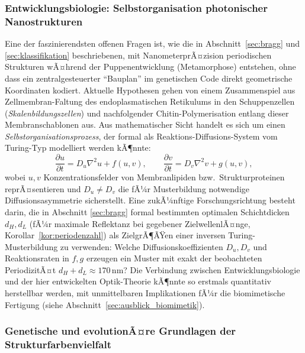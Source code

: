 ﻿\documentclass[a4paper,12pt]{article}
\theoremstyle{definition}
\begin{document}
	\subsubsection{Entwicklungsbiologie: Selbstorganisation photonischer Nanostrukturen}

	Eine der faszinierendsten offenen Fragen ist, wie die in
	Abschnitt~\ref{sec:bragg} und \ref{sec:klassifikation} beschriebenen,
	mit NanometerprÃ¤zision periodischen Strukturen wÃ¤hrend der
	Puppenentwicklung (Metamorphose) entstehen, ohne dass ein
	zentralgesteuerter ``Bauplan'' im genetischen Code direkt
	geometrische Koordinaten kodiert. Aktuelle Hypothesen gehen von
	einem Zusammenspiel aus Zellmembran-Faltung des endoplasmatischen
	Retikulums in den Schuppenzellen (\textit{Skalenbildungszellen})
	und nachfolgender Chitin-Polymerisation entlang dieser Membranschablonen
	aus. Aus mathematischer Sicht handelt es sich um einen
	\emph{Selbstorganisationsprozess}, der formal als
	Reaktions-Diffusions-System vom Turing-Typ modelliert werden kÃ¶nnte:
	\[
	\frac{\partial u}{\partial t} = D_u \nabla^2 u + f(u,v), \qquad
	\frac{\partial v}{\partial t} = D_v \nabla^2 v + g(u,v),
	\]
	wobei $u,v$ Konzentrationsfelder von Membranlipiden bzw.\
	Strukturproteinen reprÃ¤sentieren und $D_u \ne D_v$ die fÃ¼r
	Musterbildung notwendige Diffusionsasymmetrie sicherstellt. Eine
	zukÃ¼nftige Forschungsrichtung besteht darin, die in Abschnitt
	\ref{sec:bragg} formal bestimmten optimalen Schichtdicken $d_H,d_L$
	(fÃ¼r maximale Reflektanz bei gegebener ZielwellenlÃ¤nge,
	Korollar~\ref{kor:periodenzahl}) als ZielgrÃ¶ÃŸen einer inversen
	Turing-Musterbildung zu verwenden: Welche Diffusionskoeffizienten
	$D_u,D_v$ und Reaktionsraten in $f,g$ erzeugen ein Muster mit exakt der
	beobachteten PeriodizitÃ¤t $d_H+d_L\approx 170$\,nm? Die Verbindung
	zwischen Entwicklungsbiologie und der hier entwickelten Optik-Theorie
	kÃ¶nnte so erstmals quantitativ herstellbar werden, mit unmittelbaren
	Implikationen fÃ¼r die biomimetische Fertigung (siehe
	Abschnitt~\ref{sec:ausblick_biomimetik}).

	\subsubsection{Genetische und evolutionÃ¤re Grundlagen der Strukturfarbenvielfalt}
	\label{sec:ausblick_genetik}
\end{document}
